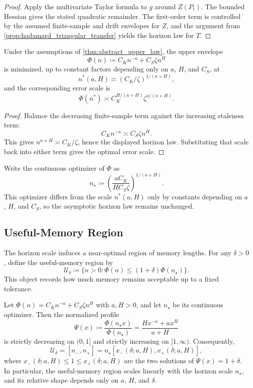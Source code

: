 \begin{proof}
Apply the multivariate Taylor formula to $g$ around $Z(P_t)$. The bounded Hessian
gives the stated quadratic remainder. The first-order term is controlled by the
assumed finite-sample and drift envelopes for $Z$, and the argument from
\cref{prop:hadamard_triangular_transfer} yields the horizon law for $T$.
\end{proof}

\begin{corollary}
\label{cor:temporal_validity_horizon}
Under the assumptions of \cref{thm:abstract_upper_law}, the upper envelope
\[
  \Phi(n) \coloneqq C_K n^{-a} + C_S\zeta n^H
\]
is minimized, up to constant factors depending only on $a$, $H$, and $C_S$, at
\[
  n^*(a,H) \asymp (C_K/\zeta)^{1/(a+H)},
\]
and the corresponding error scale is
\[
  \Phi(n^*) \asymp C_K^{H/(a+H)}\zeta^{a/(a+H)}.
\]
\end{corollary}

\begin{proof}
Balance the decreasing finite-sample term against the increasing staleness term:
\[
  C_K n^{-a} \asymp C_S\zeta n^H.
\]
This gives $n^{a+H}\asymp C_K/\zeta$, hence the displayed horizon law. Substituting
that scale back into either term gives the optimal error scale.
\end{proof}

Write the continuous optimizer of $\Phi$ as
\[
  n_\star \coloneqq \left(\frac{aC_K}{H C_S\zeta}\right)^{1/(a+H)}.
\]
This optimizer differs from the scale $n^*(a,H)$ only by constants depending on
$a$, $H$, and $C_S$, so the asymptotic horizon law remains unchanged.

\subsection{Useful-Memory Region}

The horizon scale induces a near-optimal region of memory lengths. For any
$\delta>0$, define the useful-memory region by
\[
  \mathcal U_\delta \coloneqq \{n>0: \Phi(n) \le (1+\delta)\Phi(n_\star)\}.
\]
This object records how much memory remains acceptable up to a fixed tolerance.

\begin{proposition}
\label{prop:useful_memory_region}
Let $\Phi(n)=C_K n^{-a}+C_S\zeta n^H$ with $a,H>0$, and let $n_\star$ be its
continuous optimizer. Then the normalized profile
\[
  \Psi(x) \coloneqq \frac{\Phi(n_\star x)}{\Phi(n_\star)}
  = \frac{H x^{-a} + a x^H}{a+H}
\]
is strictly decreasing on $(0,1]$ and strictly increasing on $[1,\infty)$.
Consequently,
\[
  \mathcal U_\delta = [n_-,n_+] = n_\star[x_-(\delta;a,H),x_+(\delta;a,H)],
\]
where $x_-(\delta;a,H)\le 1 \le x_+(\delta;a,H)$ are the two solutions of
$\Psi(x)=1+\delta$. In particular, the useful-memory region scales linearly with
the horizon scale $n_\star$, and its relative shape depends only on $a$, $H$,
and $\delta$.
\end{proposition}

